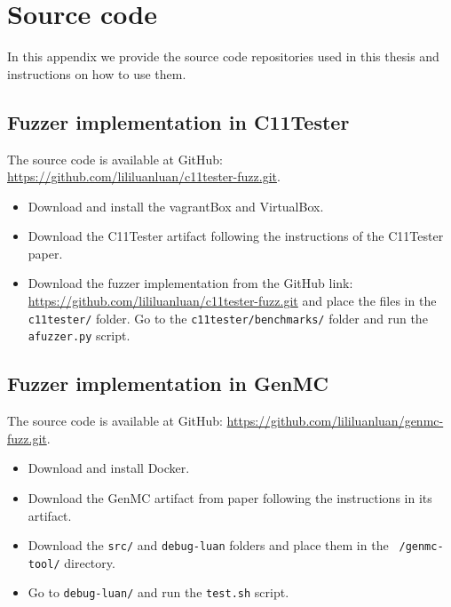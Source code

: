 \chapter{\label{cha:source-code}Source code}


In this appendix we provide the source code repositories used in this thesis and instructions on how to use them.

\section{Fuzzer implementation in C11Tester}

The source code is available at GitHub: \href{https://github.com/lililuanluan/c11tester-fuzz.git}{https://github.com/lililuanluan/c11tester-fuzz.git}.


\begin{itemize}
    \item Download and install the vagrantBox\cite{vagrantBox} and VirtualBox\cite{virtualbox}. 
	\item Download the C11Tester artifact following the instructions of the C11Tester\cite{c11tester} paper.
	\item Download the fuzzer implementation from the GitHub link: \href{https://github.com/lililuanluan/c11tester-fuzz.git}{https://github.com/lililuanluan/c11tester-fuzz.git} and place the files in the \texttt{c11tester/} folder. Go to the \texttt{c11tester/benchmarks/} folder and run the \texttt{afuzzer.py} script. 
\end{itemize}


\section{Fuzzer implementation in GenMC}

The source code is available at GitHub: \href{https://github.com/lililuanluan/genmc-fuzz.git}{https://github.com/lililuanluan/genmc-fuzz.git}.

\begin{itemize}
    \item Download and install Docker\cite{docker}. 
	\item Download the GenMC artifact from paper \cite{genmc-enhance} following the instructions in its artifact\cite{genmc-enhance-artifact}.
	\item Download the \texttt{src/} and \texttt{debug-luan} folders and place them in the \texttt{~/genmc-tool/} directory. 
    \item Go to \texttt{debug-luan/} and run the \texttt{test.sh} script. 
\end{itemize}